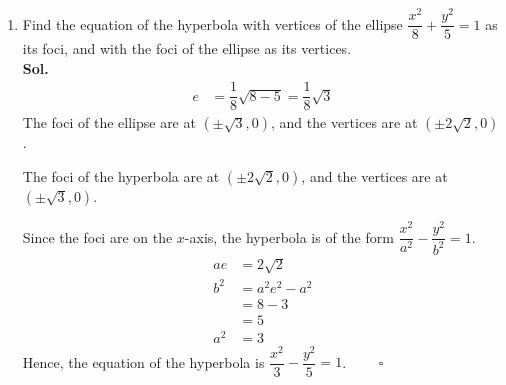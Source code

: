 \documentclass{report}
\newcommand{\sol}{\vspace{1em}\\\textbf{Sol.}}
\newcommand{\eos}{ \qquad \square}
\begin{document}
\begin{enumerate}[leftmargin=*]
\begin{enumerate}
                    Substituting $y' = y+4$, we get $\dfrac{(y+4)^2}{32}-\dfrac{x^2}{4}=1$. $\eos$

              \item Imaginary axis length is 6, vertices at $(3,2), (-5,2)$. \sol{} The center of
                    the hyperbola is the midpoint of the vertices, which is $(-1,2)$.

                    Move the center of the hyperbola to the origin and form a new coordinate system
                    such that
                    \begin{align*}
                        x' = x+1 \qquad y' = y-2
                    \end{align*}
                    Since the vertices are on the $x$-axis, the hyperbola is of the form
                    $\dfrac{x'^2}{a^2}-\dfrac{y'^2}{b^2}=1$.

                    The vertices are now at $(4,0), (-4,0)$, and the imaginary axis length is 6.
                    \begin{align*}
                        a & = 4\qquad b = 3
                    \end{align*}
                    Hence, the equation of the hyperbola is $\dfrac{(x+1)^2}{16}-\dfrac{(y-2)^2}{9}=1$. $\eos$

          \end{enumerate}

    \item Find the equation of the hyperbola with vertices of the ellipse
          $\dfrac{x^2}{8}+\dfrac{y^2}{5}=1$ as its foci, and with the foci of the ellipse
          as its vertices. \sol{}
          \begin{align*}
              e & = \dfrac{1}{8}\sqrt{8-5} = \dfrac{1}{8}\sqrt{3}
          \end{align*}
          The foci of the ellipse are at $(\pm \sqrt{3}, 0)$, and the vertices are at $(\pm 2\sqrt{2}, 0)$.

          The foci of the hyperbola are at $(\pm 2\sqrt{2}, 0)$, and the vertices are at
          $(\pm \sqrt{3}, 0)$.

          Since the foci are on the $x$-axis, the hyperbola is of the form
          $\dfrac{x^2}{a^2}-\dfrac{y^2}{b^2}=1$.
          \begin{align*}
              ae  & = 2\sqrt{2}    \\
              b^2 & = a^2e^2 - a^2 \\
                  & = 8 - 3        \\
                  & = 5            \\
              a^2 & = 3
          \end{align*}
          Hence, the equation of the hyperbola is $\dfrac{x^2}{3}-\dfrac{y^2}{5}=1$. $\eos$


\end{enumerate}
\end{document}
